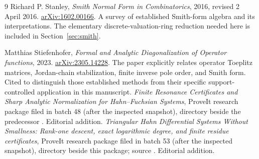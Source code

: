\documentclass[11pt,a4paper]{article}
\numberwithin{equation}{section}
\theoremstyle{definition}
\theoremstyle{remark}
\theoremstyle{definition}
\begin{document}
\begin{thebibliography}{9}
Richard P. Stanley, \emph{Smith Normal Form in Combinatorics}, 2016, revised 2 April 2016.
\href{https://arxiv.org/abs/1602.00166}{arXiv:1602.00166}.
A survey of established Smith-form algebra and its interpretations. The elementary discrete-valuation-ring reduction needed here is included in Section~\ref{sec:smith}.

Matthias Stiefenhofer, \emph{Formal and Analytic Diagonalization of Operator functions}, 2023.
\href{https://arxiv.org/abs/2305.14228}{arXiv:2305.14228}.
The paper explicitly relates operator Toeplitz matrices, Jordan-chain stabilization, finite inverse pole order, and Smith form. Cited to distinguish those established methods from their specific support-controlled application in this manuscript.
\emph{Finite Resonance Certificates and Sharp Analytic Normalization for Hahn--Fuchsian Systems}, ProveIt research package filed in batch 48 (after the inspected snapshot), directory  beside the predecessor \cite{repo-residue}. Editorial addition.
\emph{Triangular Hahn Differential Systems Without Smallness: Rank-one descent, exact logarithmic degree, and finite residue certificates}, ProveIt research package filed in batch 53 (after the inspected snapshot), directory  beside this package; source . Editorial addition.
\end{thebibliography}
\end{document}
